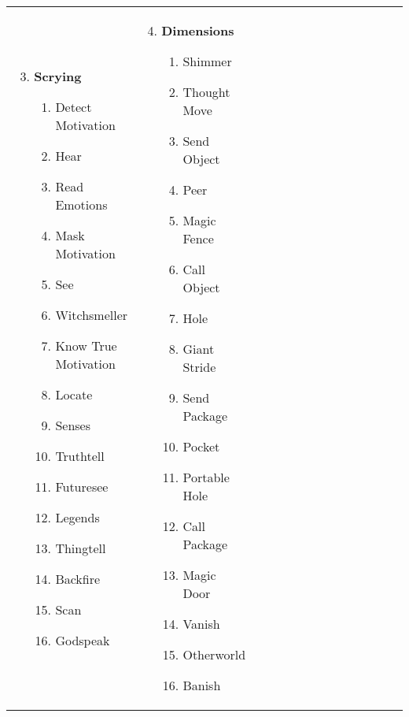 \begin{tabular}{@{} p{0.25\linewidth} p{0.25\linewidth} p{0.25\linewidth} p{0.25\linewidth}}
\begin{enumerate}
	\setcounter{enumi}{2}
	\item \textbf{Scrying}
	\begin{enumerate}
		\item Detect Motivation
		\item Hear
		\item Read Emotions
		\item Mask Motivation
		\item See
		\item Witchsmeller
		\item Know True Motivation
		\item Locate
		\item Senses
		\item Truthtell
		\item Futuresee
		\item Legends
		\item Thingtell
		\item Backfire
		\item Scan
		\item Godspeak
	\end{enumerate}
\end{enumerate} &
\begin{enumerate}
	\setcounter{enumi}{3}
	\item \textbf{Dimensions}
	\begin{enumerate}
		\item Shimmer
		\item Thought Move
		\item Send Object
		\item Peer
		\item Magic Fence
		\item Call Object
		\item Hole
		\item Giant Stride
		\item Send Package
		\item Pocket
		\item Portable Hole
		\item Call Package
		\item Magic Door
		\item Vanish
		\item Otherworld
		\item Banish
	\end{enumerate}
\end{enumerate} \\
\end{tabular}
\pagebreak

